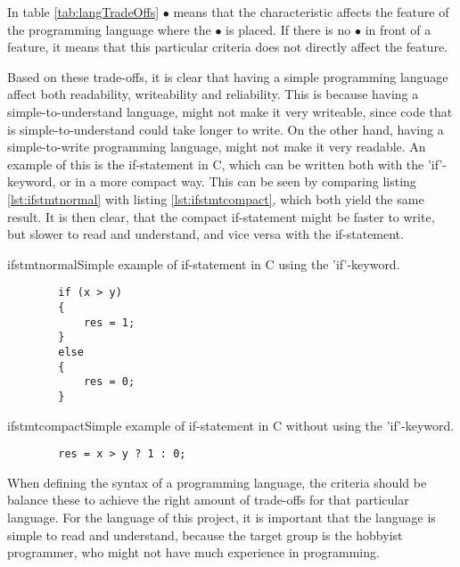 In table \ref{tab:langTradeOffs} $\bullet$ means that the characteristic affects the feature of the programming language where the $\bullet$ is placed. If there is no $\bullet$ in front of a feature, it means that this particular criteria does not directly affect the feature. 

Based on these trade-offs, it is clear that having a simple programming language affect both readability, writeability and reliability. 
This is because having a simple-to-understand language, might not make it very writeable, since code that is simple-to-understand could take longer to write. 
On the other hand, having a simple-to-write programming language, might not make it very readable. An example of this is the if-statement in C, which can be written both with the 'if'-keyword, or in a more compact way. This can be seen by comparing listing \ref{lst:ifstmtnormal} with listing \ref{lst:ifstmtcompact}, which both yield the same result. It is then clear, that the compact if-statement might be faster to write, but slower to read and understand, and vice versa with the if-statement.

\begin{code}{ifstmtnormal}{Simple example of if-statement in C using the 'if'-keyword.}
	\begin{lstlisting}
		if (x > y)
		{
    		res = 1;
		}
		else
		{
    		res = 0;
		}
	\end{lstlisting}
\end{code}

\begin{code}{ifstmtcompact}{Simple example of if-statement in C without using the 'if'-keyword.}
	\begin{lstlisting}
		res = x > y ? 1 : 0;
	\end{lstlisting}
\end{code}

When defining the syntax of a programming language, the criteria should be balance these to achieve the right amount of trade-offs for that particular language. For the language of this project, it is important that the language is simple to read and understand, because the target group is the hobbyist programmer, who might not have much experience in programming.

